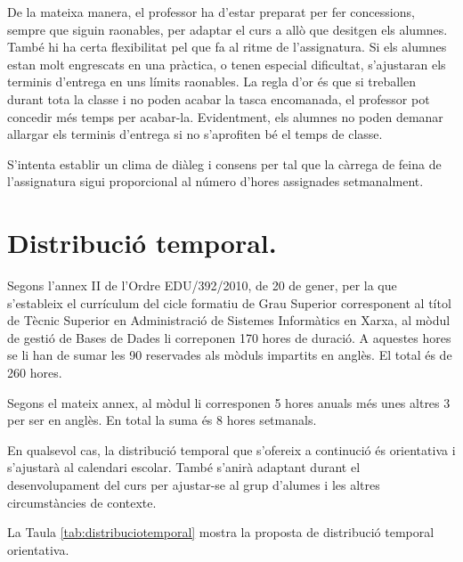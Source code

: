 \documentclass[catalan, a4paper, 12pt, titlepage]{article}
\begin{document}
De la mateixa manera, el professor ha d'estar preparat per fer concessions, sempre que siguin raonables, per adaptar el curs a allò que desitgen els alumnes.
També hi ha certa flexibilitat pel que fa al ritme de l'assignatura. 
Si els alumnes estan molt engrescats en una pràctica, o tenen especial dificultat, s'ajustaran els terminis d'entrega en uns límits raonables.
La regla d'or és que si treballen durant tota la classe i no poden acabar la tasca encomanada, el professor pot concedir més temps per acabar-la.
Evidentment, els alumnes no poden demanar allargar els terminis d'entrega si no s'aprofiten bé el temps de classe.

S'intenta establir un clima de diàleg i consens per tal que la càrrega de feina de l'assignatura sigui proporcional al número d'hores assignades setmanalment.


\section{Distribució temporal.}
\label{sec:distribució}

Segons l'annex II de l'Ordre EDU/392/2010, de 20 de gener, per la que s'estableix el currículum del cicle formatiu de Grau Superior corresponent al títol de Tècnic Superior en Administració de Sistemes Informàtics en Xarxa, al mòdul de gestió de Bases de Dades li correponen 170 hores de duració. A aquestes hores se li han de sumar les 90 reservades als mòduls impartits en anglès. El total és de 260 hores.

Segons el mateix annex, al mòdul li corresponen 5 hores anuals més unes altres 3 per ser en anglès. En total la suma és 8 hores setmanals.

En qualsevol cas, la distribució temporal que s'ofereix a continució és orientativa i s'ajustarà al calendari escolar. També s'anirà adaptant durant el desenvolupament del curs per ajustar-se al grup d'alumes i les altres circumstàncies de contexte.

La Taula \ref{tab:distribuciotemporal} mostra la proposta de distribució temporal orientativa.
\end{document}
